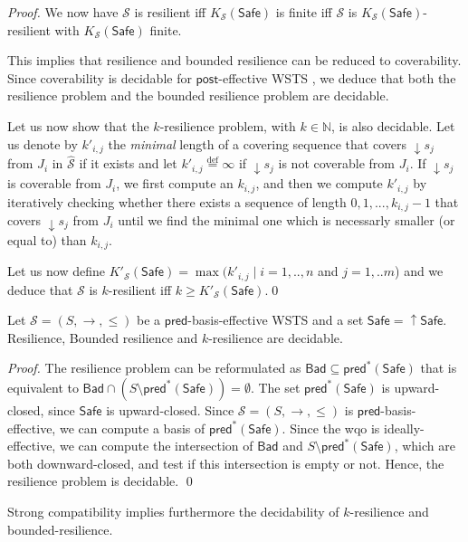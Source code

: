 \documentclass[runningheads]{llncs}
\newcommand{\alain}[1]{\todo[inline,color=red!20]{{\bf AF:} #1}}
\newcommand{\pred}{\textsf{pred}}
\newcommand{\post}{\textsf{post}}
\newcommand{\Bad}{\textsf{Bad}}
\newcommand{\Safe}{\textsf{Safe}}
\begin{document}
\begin{proof}
%
We now have $\mathscr{S}$ is resilient iff $K_{\mathscr{S}}(\Safe)$ is finite iff $\mathscr{S}$ is $K_{\mathscr{S}}(\Safe)$-resilient with $K_{\mathscr{S}}(\Safe)$ finite.

This implies that resilience and bounded resilience can be reduced to coverability.
Since coverability is decidable for $\post$-effective WSTS \cite{BFM-ic17}, we deduce that both the 
  resilience problem and the bounded resilience problem are decidable.



Let us now show that the $k$-resilience problem, with $k \in \mathbb{N}$, is also decidable.
Let us denote by $k'_{i,j}$ the \emph{minimal} length of a covering sequence that covers $\mathop{\downarrow} s_j$ from $J_i$ in $\hat{\mathscr{S}}$ if it exists and let $k'_{i,j}\stackrel{\text{def}}{=}\infty$ if $\mathop{\downarrow} s_j$ is not coverable from $J_i$. 
If $\mathop{\downarrow} s_j$ is coverable from $J_i$, we first compute an $k_{i,j}$, and then we compute $k'_{i,j}$ by iteratively checking whether there exists a sequence of length $0,1,...,k_{i,j}-1$ that covers $\mathop{\downarrow} s_j$ from $J_i$ until we find the minimal one which is necessarly smaller (or equal to) than $k_{i,j}$.

Let us now define $K'_{\mathscr{S}}(\Safe)=\max(k'_{i,j} \mid i=1,..,n$ and $j= 1,..m$) and we deduce that  $\mathscr{S}$ is $k$-resilient iff $k \geq K'_{\mathscr{S}}(\Safe)$.\qed
\end{proof} 


\begin{theorem}\label{xxx}
Let $\mathscr{S}=(S,\rightarrow, \leq)$ be a $\pred$-basis-effective WSTS and a set $\Safe = \mathop{\uparrow} \Safe$.
{\sc Resilience}, {\sc Bounded resilience} 
and {\sc $k$-resilience} are decidable.
\end{theorem}

\begin{proof}
The resilience problem can be reformulated as 
$\Bad \subseteq  \pred^*(\Safe)$ that is equivalent to $\Bad \cap (S \setminus \pred^*(\Safe)) = \emptyset$.
The set $\pred^*(\Safe)$ is upward-closed, since $\Safe$ is upward-closed. Since $\mathscr{S}=(S,\rightarrow, \leq)$ is $\pred$-basis-effective, we can compute a basis of $\pred^*(\Safe)$.
Since the wqo is ideally-effective, we can compute the intersection of
$\Bad$
and
$S \setminus \pred^*(\Safe)$,
which are both downward-closed, and test if this intersection is empty or not. Hence, the resilience problem is decidable. \qed\end{proof} 
Strong compatibility implies furthermore the decidability
of {\sc $k$-resilience} and {\sc bounded-resilience}.
\end{document}
